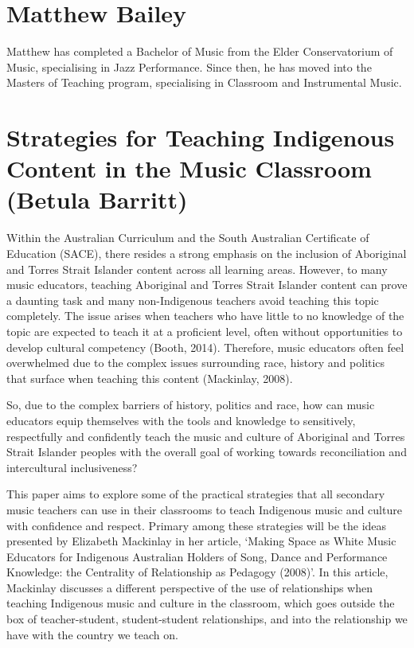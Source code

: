 \documentclass[twoside,14pt,a4paper,notitlepage]{memoir}
\begin{document}
\section*{Matthew Bailey}

Matthew has completed a Bachelor of Music from the Elder Conservatorium of Music, specialising in Jazz Performance. Since then, he has moved into the Masters of Teaching program, specialising in Classroom and Instrumental Music.


\section*{Strategies for Teaching Indigenous Content in the Music Classroom (Betula Barritt)}
\label{aut:barritt}

Within the Australian Curriculum and the South Australian Certificate of Education (SACE), there resides a strong emphasis on the inclusion of Aboriginal and Torres Strait Islander content across all learning areas. However, to many music educators, teaching Aboriginal and Torres Strait Islander content can prove a daunting task and many non-Indigenous teachers avoid teaching this topic completely. The issue arises when teachers who have little to no knowledge of the topic are expected to teach it at a proficient level, often without opportunities to develop cultural competency (Booth, 2014). Therefore, music educators often feel overwhelmed due to the complex issues surrounding race, history and politics that surface when teaching this content (Mackinlay, 2008).
 
So, due to the complex barriers of history, politics and race, how can music educators equip themselves with the tools and knowledge to sensitively, respectfully and confidently teach the music and culture of Aboriginal and Torres Strait Islander peoples with the overall goal of working towards reconciliation and intercultural inclusiveness?
 
This paper aims to explore some of the practical strategies that all secondary music teachers can use in their classrooms to teach Indigenous music and culture with confidence and respect. Primary among these strategies will be the ideas presented by Elizabeth Mackinlay in her article, ‘Making Space as White Music Educators for Indigenous Australian Holders of Song, Dance and Performance Knowledge: the Centrality of Relationship as Pedagogy (2008)’. In this article, Mackinlay discusses a different perspective of the use of relationships when teaching Indigenous music and culture in the classroom, which goes outside the box of teacher-student, student-student relationships, and into the relationship we have with the country we teach on.
\end{document}
